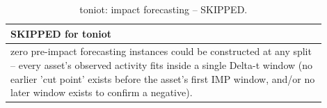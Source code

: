 \begin{table}[t]
\centering
\caption{toniot: impact forecasting -- SKIPPED.}
\label{tab:toniot_impact_forecasting}
\begin{tabular}{p{0.9\linewidth}}
\toprule
\textbf{SKIPPED for toniot} \\
\midrule
zero pre-impact forecasting instances could be constructed at any split -- every asset's observed activity fits inside a single Delta-t window (no earlier 'cut point' exists before the asset's first IMP window, and/or no later window exists to confirm a negative). \\
\bottomrule
\end{tabular}
\end{table}
